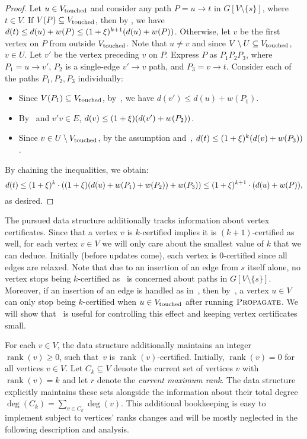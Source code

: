 \documentclass[11pt,letterpaper]{article}
\theoremstyle{plain}
\newcommand{\wei}{w}
\DeclareMathOperator*{\rank}{rank}
\DeclareMathOperator*{\PD}{\textsc{Propagate}}
\begin{document}
\begin{proof}
Let $u\in V_{\mathrm{touched}}$ and consider any path $P = u \to t$ in $G[V\setminus\{s\}]$, where $t\in V$.
  If $V(P)\subseteq V_{\mathrm{touched}}$, then by , we have 
  $d(t)\leq d(u)+\wei(P)\leq (1+\epsp)^{k+1}(d(u)+\wei(P))$.
  Otherwise, let $v$ be the first vertex on $P$ from outside $V_{\mathrm{touched}}$.
  Note that $u\neq v$ and since $V\setminus U\subseteq V_{\mathrm{touched}}$, $v\in U$.
  Let $v'$ be the vertex preceding $v$ on $P$.
  Express $P$ as $P_1P_2P_3$, where $P_1=u\to v'$, $P_2$ is a single-edge $v'\to v$ path, and $P_3=v\to t$.
  Consider each of the paths $P_1,P_2,P_3$ individually:
  \begin{itemize}
    \item Since $V(P_1)\subseteq V_{\mathrm{touched}}$, by~, we have $d(v')\leq d(u)+\wei(P_1)$.
    \item By~ and $v'v\in E$, $d(v)\leq (1+\epsp)(d(v')+\wei(P_2))$.
    \item Since $v\in U\setminus V_{\mathrm{touched}}$, by the assumption and~, $d(t)\leq (1+\epsp)^k(d(v)+\wei(P_3))$.
  \end{itemize}
  By chaining the inequalities, we obtain:
  \[
    d(t)\leq (1+\epsp)^k\cdot ((1+\epsp)(d(u)+\wei(P_1)+\wei(P_2))+\wei(P_3))
        \leq (1+\epsp)^{k+1}\cdot (d(u)+\wei(P)),
  \]
  as desired.
\end{proof}


The pursued data structure additionally tracks information about vertex certificates.
Since that a vertex $v$ is $k$-certified implies it is $(k + 1)$-certified as well,
for each vertex $v \in V$ we will only care about the smallest value of $k$ that we can deduce.
Initially (before updates come), each vertex is $0$-certified since all edges are relaxed.
Note that due to an insertion of an edge from $s$ itself alone, no vertex stops being $k$-certified as~ is concerned about paths in $G[V\setminus\{s\}]$.
Moreover, if an insertion of an edge is handled as in~, then by~,
a vertex $u \in V$ can only stop being $k$-certified when $u \in V_{\mathrm{touched}}$ after running $\PD$.
We will show that~ is useful for controlling this effect and keeping vertex certificates small.

For each $v \in V$, the data structure additionally maintains an integer $\rank(v)\geq 0$, such that~$v$ is $\rank(v)$-certified.
Initially, $\rank(v) = 0$ for all vertices $v\in V$.
Let $C_k \subseteq V$ denote the current set of vertices $v$ with $\rank(v) = k$ and let $r$ denote the \emph{current maximum rank}.
The data structure explicitly maintains these sets alongside the information about their total degree $\deg(C_k)=\sum_{v\in C_k}\deg(v)$.
This additional bookkeeping is easy to implement subject to vertices' ranks changes and will be mostly neglected in the following description and analysis.
\end{document}
